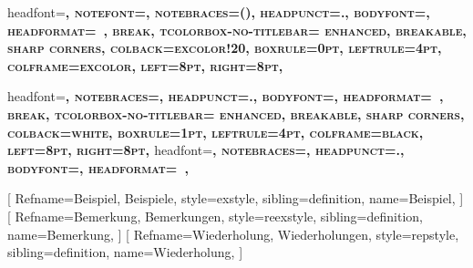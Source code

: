 {
headfont=\normalfont\scshape\bfseries,
notefont=\normalfont\bfseries,
notebraces={(}{)},  %
headpunct={.},
bodyfont=\normalfont,
headformat=\NAME~\NUMBER\NOTE,
break,
tcolorbox-no-titlebar={
    enhanced,
    breakable,
    sharp corners,
    colback=excolor!20,
    boxrule=0pt,
    leftrule=4pt,       
    colframe=excolor,
    left=8pt,
    right=8pt,
  }
}

{
headfont=\normalfont\bfseries\scshape,
notebraces={}{},
headpunct={.},
bodyfont=\normalfont,
headformat=\NAME~\NUMBER\NOTE,
break,
tcolorbox-no-titlebar={
    enhanced,
    breakable,
    sharp corners,
    colback=white,
    boxrule=1pt,  
    leftrule=4pt,    
    colframe=black,
    left=8pt,
    right=8pt,
  }
}
{
headfont=\normalfont\bfseries\scshape,
notebraces={}{},
headpunct={.},
bodyfont=\normalfont,
headformat=\NAME~\NUMBER\NOTE,
}


[
  Refname={Beispiel, Beispiele},
  style=exstyle,  
  sibling=definition,
  name=Beispiel,
]
[
  Refname={Bemerkung, Bemerkungen},
  style=reexstyle,
  sibling=definition,
  name=Bemerkung,
]
[
  Refname={Wiederholung, Wiederholungen},
  style=repstyle, 
  sibling=definition,
  name=Wiederholung,
]

\automark*[section]{}

\clearpairofpagestyles
\rohead{%
  \headmark\quad
  \makebox[0pt][l]{%
    \makebox[\marginparsep][r]{%
    \raisebox{0pt}[\ht\strutbox][\dp\strutbox]{%
      \rule[-\dp\strutbox]{1pt}{\dimexpr 1in+\topmargin+\headheight+7mm}%
      }%
    \nobreakspace
    }%
    \makebox[\marginparwidth][l]{\footnotesize\pagemark}%
  }%
}
\lehead{%
  \makebox[0pt][r]{%
    \makebox[0pt][r]{\footnotesize\pagemark}%
    \makebox[\marginparsep][l]{%
      \nobreakspace
      \raisebox{0pt}[\ht\strutbox][\dp\strutbox]{%
        \rule[-\dp\strutbox]{1pt}{\dimexpr 1in+\topmargin+\headheight+7mm}%
      }%
    }%
  }%
  \quad\headmark
}

\renewcommand*{\chaptermarkformat}{%
\footnotesize{\bfseries\chapapp~\thechapter}\autodot\enskip}
\renewcommand*{\sectionmarkformat}{%
\footnotesize{\bfseries\thesection}\autodot\enskip}

\renewcommand*{\chaptermark}[1]{%
  \markboth{%
    \Ifnumbered{chapter}{%
      \MakeMarkcase{\chaptermarkformat}%
    }{}%
    \MakeMarkcase{\textls{#1}}%
  }{%
    \Ifnumbered{chapter}{%
      \MakeMarkcase{\chaptermarkformat}%
    }{}%
    \MakeMarkcase{\textls{#1}}%
  }%
}

